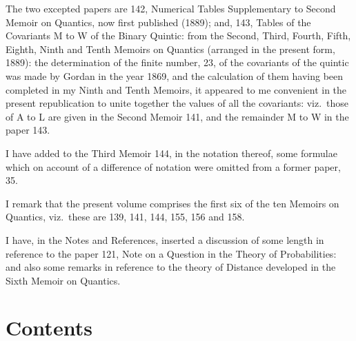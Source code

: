 \documentclass[11pt,a4paper]{book}
\begin{document}
The two excepted papers are 142, Numerical Tables Supplementary to Second Memoir on Quantics, now first published (1889); and, 143, Tables of the Covariants M to W of the Binary Quintic: from the Second, Third, Fourth, Fifth, Eighth, Ninth and Tenth Memoirs on Quantics (arranged in the present form, 1889): the determination of the finite number, 23, of the covariants of the quintic was made by Gordan in the year 1869, and the calculation of them having been completed in my Ninth and Tenth Memoirs, it appeared to me convenient in the present republication to unite together the values of all the covariants: viz.\ those of A to L are given in the Second Memoir 141, and the remainder M to W in the paper 143.

I have added to the Third Memoir 144, in the notation thereof, some formulae which on account of a difference of notation were omitted from a former paper, 35.

I remark that the present volume comprises the first six of the ten Memoirs on Quantics, viz.\ these are 139, 141, 144, 155, 156 and 158.

I have, in the Notes and References, inserted a discussion of some length in reference to the paper 121, Note on a Question in the Theory of Probabilities: and also some remarks in reference to the theory of Distance developed in the Sixth Memoir on Quantics.
\clearpage

\section*{Contents}
\end{document}
